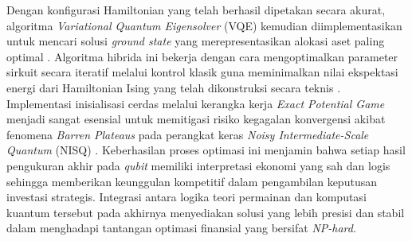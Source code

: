 Dengan konfigurasi Hamiltonian yang telah berhasil dipetakan secara akurat, algoritma \textit{Variational Quantum Eigensolver} (VQE) kemudian diimplementasikan untuk mencari solusi \textit{ground state} yang merepresentasikan alokasi aset paling optimal \cite{wang_variational_2025}. Algoritma hibrida ini bekerja dengan cara mengoptimalkan parameter sirkuit secara iteratif melalui kontrol klasik guna meminimalkan nilai ekspektasi energi dari Hamiltonian Ising yang telah dikonstruksi secara teknis \cite{fedorov_vqe_2022}. Implementasi inisialisasi cerdas melalui kerangka kerja \textit{Exact Potential Game} menjadi sangat esensial untuk memitigasi risiko kegagalan konvergensi akibat fenomena \textit{Barren Plateaus} pada perangkat keras \textit{Noisy Intermediate-Scale Quantum} (NISQ) \cite{mcclean_barren_2018, preskill_quantum_2018}. Keberhasilan proses optimasi ini menjamin bahwa setiap hasil pengukuran akhir pada \textit{qubit} memiliki interpretasi ekonomi yang sah dan logis sehingga memberikan keunggulan kompetitif dalam pengambilan keputusan investasi strategis. Integrasi antara logika teori permainan dan komputasi kuantum tersebut pada akhirnya menyediakan solusi yang lebih presisi dan stabil dalam menghadapi tantangan optimasi finansial yang bersifat \textit{NP-hard}.
